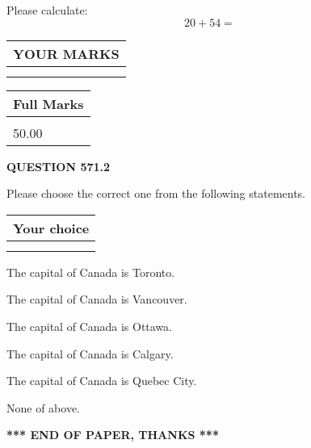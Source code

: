 \documentclass[12pt]{article}
\begin{document}
  
 
Please calculate:
\begin{equation}
20 +  %
54 = \nonumber
\end{equation}
 

 

 
  
\vspace{0.2in}
  
\noindent\begin{tabular}{|l|}
\hline
 YOUR MARKS  \\
\hline
 \\ 
 \\ 
\hline
\end{tabular}
\hspace{0.05in} \begin{tabular}{|l|}
\hline
 Full Marks  \\
\hline
 \\ 
50.00 \\
\hline
\end{tabular}
{\textbf{\Large{QUESTION
571.2 
}}}
  
  
Please choose the correct one from the following statements.
  
  
\noindent\hspace{3.0in} \begin{tabular}{|l|}
\hline
Your choice \\
\hline
 \\ 
 \\ 
\hline
\end{tabular}
  
  
 
 
The capital of Canada is Toronto.
 
 
The capital of Canada is Vancouver.
 
 
The capital of Canada is Ottawa.
 
 
The capital of Canada is Calgary.
 
 
The capital of Canada is Quebec City.
 
 
 None of above.
 
 
   
   
 \vspace{0.2in}
 
   
   
   
   
\vspace{1.0in} 
{\textbf{\large{ *** END OF PAPER, THANKS *** }}} 
   
\end{document}

